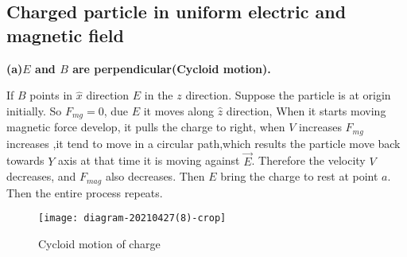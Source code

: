 \subsection{Charged particle in uniform electric and magnetic field }
\textbf{(a)}\quad \textbf{$E$ and $B$ are perpendicular(Cycloid motion).}\\
\begin{minipage}{0.65\textwidth}
		If $B$ points in $\hat{x}$ direction $E$ in the $z$ direction. Suppose the particle is at origin initially. So $F_{mg} =0$, due $E$ it moves along $\hat{z} $ direction, When it starts moving magnetic force develop, it pulls the charge to right, when $V$ increases $F_{mg} $ increases ,it tend to move in a circular path,which results the particle move back towards $Y$ axis at that time it is moving against $\vec{E}$. Therefore the velocity  $V$ decreases, and $F_{mag} $ also decreases. Then $E$ bring the charge to rest at point $a$. Then  the entire process repeats.
\end{minipage}
\begin{minipage}{0.35\textwidth}
	\begin{figure}[H]
		\centering
		\texttt{[image: diagram-20210427(8)-crop]}
		\caption{Cycloid motion of charge}
		\label{cycloid }
	\end{figure}
\end{minipage}
